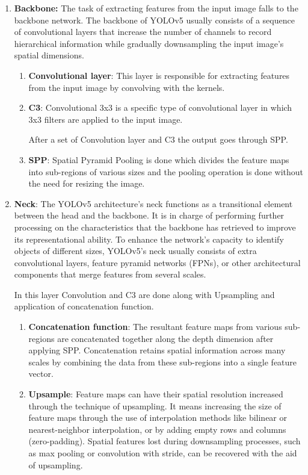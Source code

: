 \documentclass[12pt,a4paper]{report}
\begin{document}
\begin{enumerate}
   \item {\bf{ Backbone:}} The task of extracting features from the input image falls to the backbone network. The backbone of YOLOv5 usually consists of a sequence of convolutional layers that increase the number of channels to record hierarchical information while gradually downsampling the input image's spatial dimensions.
   \begin{enumerate}
       \item {\bf{Convolutional layer}}: This layer is responsible for extracting features from the input image by convolving with the kernels.
       \item {\bf{C3}}: Convolutional 3x3 is a specific type of convolutional layer in which 3x3 filters are applied to the input image.
       \par After a set of Convolution layer and C3 the output goes through SPP.
       \item {\bf{SPP}}: Spatial Pyramid Pooling is done which divides the feature maps into sub-regions of various sizes and the pooling operation is done without the need for resizing the image.
   \end{enumerate}
   \item {\bf{ Neck}}: The YOLOv5 architecture's neck functions as a transitional element between the head and the backbone. It is in charge of performing further processing on the characteristics that the backbone has retrieved to improve its representational ability. To enhance the network's capacity to identify objects of different sizes, YOLOv5's neck usually consists of extra convolutional layers, feature pyramid networks (FPNs), or other architectural components that merge features from several scales.\par In this layer Convolution and C3 are done along with Upsampling and application of concatenation function.
   \begin{enumerate}
       \item {\bf{Concatenation function}}: The resultant feature maps from various sub-regions are concatenated together along the depth dimension after applying SPP. Concatenation retains spatial information across many scales by combining the data from these sub-regions into a single feature vector.
       \item {\bf{Upsample}}: Feature maps can have their spatial resolution increased through the technique of upsampling. It means increasing the size of feature maps through the use of interpolation methods like bilinear or nearest-neighbor interpolation, or by adding empty rows and columns (zero-padding). Spatial features lost during downsampling processes, such as max pooling or convolution with stride, can be recovered with the aid of upsampling.

\end{enumerate}
\end{enumerate}
\end{document}
